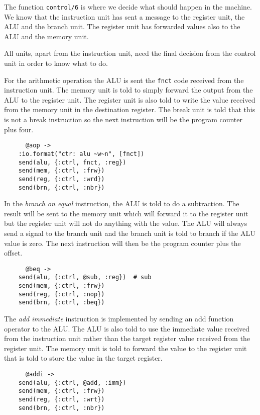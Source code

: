 \documentclass[a4paper,11pt]{article}
\begin{document}
The function {\tt control/6} is where we decide what should happen
in the machine. We know that the instruction unit has sent a message
to the register unit, the ALU and the branch unit. The register unit has forwarded
values also to the ALU and the memory unit. 

All units, apart from the instruction unit, need the final decision
from the control unit in order to know what to do.

For the arithmetic operation the ALU is sent the {\tt fnct} code
received from the instruction unit. The memory unit is told to simply
forward the output from the ALU to the register unit. The register
unit is also told to write the value received from the memory unit in
the destination register. The break unit is told that this is not a
break instruction so the next instruction will be the program counter
plus four.

\begin{verbatim}
      @aop ->
	:io.format("ctr: alu ~w~n", [fnct])
	send(alu, {:ctrl, fnct, :reg})
	send(mem, {:ctrl, :frw})
	send(reg, {:ctrl, :wrd})
	send(brn, {:ctrl, :nbr})
\end{verbatim}

In the {\em branch on equal} instruction, the ALU is told to do a
subtraction. The result will be sent to the memory unit which will
forward it to the register unit but the register unit will not do
anything with the value. The ALU will always send a signal to the
branch unit and the branch unit is told to branch if the ALU value is
zero. The next instruction will then be the program counter plus the
offset.


\begin{verbatim}        
      @beq ->
	send(alu, {:ctrl, @sub, :reg})  # sub
	send(mem, {:ctrl, :frw})
	send(reg, {:ctrl, :nop})
	send(brn, {:ctrl, :beq})
\end{verbatim}

The {\em add immediate} instruction is implemented by sending an add
function operator to the ALU. The ALU is also told to use the
immediate value received from the instruction unit rather than the
target register value received from the register unit. The memory unit
is told to forward the value to the register unit that is told to
store the value in the target register.

\begin{verbatim}
      @addi ->
	send(alu, {:ctrl, @add, :imm})
	send(mem, {:ctrl, :frw})
	send(reg, {:ctrl, :wrt})
	send(brn, {:ctrl, :nbr})
\end{verbatim}
\end{document}
